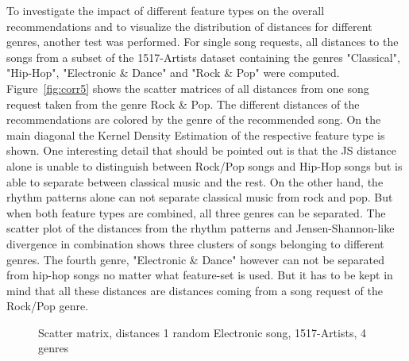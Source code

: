 \noindent To investigate the impact of different feature types on the overall recommendations and to visualize the distribution of distances for different genres, another test was performed. For single song requests, all distances to the songs from a subset of the 1517-Artists dataset containing the genres "Classical", "Hip-Hop", "Electronic \& Dance" and "Rock \& Pop" were computed. Figure~\ref{fig:corr5} shows the scatter matrices of all distances from one song request taken from the genre Rock \& Pop. The different distances of the recommendations are colored by the genre of the recommended song. 
\noindent On the main diagonal the Kernel Density Estimation of the respective feature type is shown. One interesting detail that should be pointed out is that the JS distance alone is unable to distinguish between Rock/Pop songs and Hip-Hop songs but is able to separate between classical music and the rest. On the other hand, the rhythm patterns alone can not separate classical music from rock and pop. But when both feature types are combined, all three genres can be separated. The scatter plot of the distances from the rhythm patterns and Jensen-Shannon-like divergence in combination shows three clusters of songs belonging to different genres. The fourth genre, "Electronic \& Dance" however can not be separated from hip-hop songs no matter what feature-set is used. But it has to be kept in mind that all these distances are distances coming from a song request of the Rock/Pop genre. 

\begin{figure}[htbp]
	\centering
	\caption{Scatter matrix, distances 1 random Electronic song, 1517-Artists, 4 genres}
	\label{fig:corr6}
\end{figure}
\FloatBarrier

